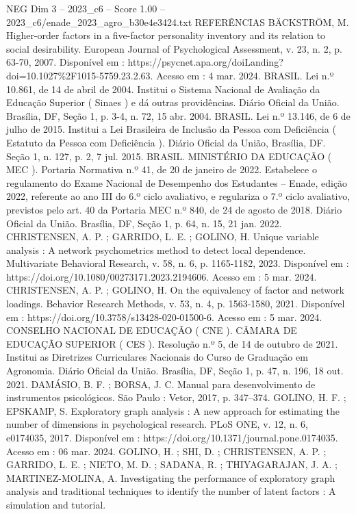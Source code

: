 \begin{textsample}{NEG Dim 3 – 2023\_c6 – Score 1.00 – 2023\_c6/enade\_2023\_agro\_b30e4e3424.txt}
REFERÊNCIAS BÄCKSTRÖM, M.
Higher-order factors in a five-factor personality inventory and its relation to social desirability.
European Journal of Psychological Assessment, v. 23, n. 2, p. 63-70, 2007.
Disponível em : https://psycnet.apa.org/doiLanding? doi=10.1027\%2F1015-5759.23.2.63.
Acesso em : 4 mar. 2024.
BRASIL.
Lei n.º 10.861, de 14 de abril de 2004.
Institui o Sistema Nacional de Avaliação da Educação Superior ( Sinaes ) e dá outras providências.
Diário Oficial da União.
Brasília, DF, Seção 1, p. 3-4, n. 72, 15 abr. 2004.
BRASIL.
Lei n.º 13.146, de 6 de julho de 2015.
Institui a Lei Brasileira de Inclusão da Pessoa com Deficiência ( Estatuto da Pessoa com Deficiência ).
Diário Oficial da União, Brasília, DF.
Seção 1, n. 127, p. 2, 7 jul. 2015.
BRASIL.
MINISTÉRIO DA EDUCAÇÃO ( MEC ).
Portaria Normativa n.º 41, de 20 de janeiro de 2022.
Estabelece o regulamento do Exame Nacional de Desempenho dos Estudantes – Enade, edição 2022, referente ao ano III do 6.º ciclo avaliativo, e regulariza o 7.º ciclo avaliativo, previstos pelo art. 40 da Portaria MEC n.º 840, de 24 de agosto de 2018.
Diário Oficial da União.
Brasília, DF, Seção 1, p. 64, n. 15, 21 jan. 2022.
CHRISTENSEN, A.
P. ; GARRIDO, L.
E. ; GOLINO, H.
Unique variable analysis : A network psychometrics method to detect local dependence.
Multivariate Behavioral Research, v. 58, n. 6, p. 1165-1182, 2023.
Disponível em : https://doi.org/10.1080/00273171.2023.2194606.
Acesso em : 5 mar. 2024.
CHRISTENSEN, A.
P. ; GOLINO, H.
On the equivalency of factor and network loadings.
Behavior Research Methods, v. 53, n. 4, p. 1563-1580, 2021.
Disponível em : https://doi.org/10.3758/s13428-020-01500-6.
Acesso em : 5 mar. 2024.
CONSELHO NACIONAL DE EDUCAÇÃO ( CNE ).
CÂMARA DE EDUCAÇÃO SUPERIOR ( CES ).
Resolução n.º 5, de 14 de outubro de 2021.
Institui as Diretrizes Curriculares Nacionais do Curso de Graduação em Agronomia.
Diário Oficial da União.
Brasília, DF, Seção 1, p. 47, n. 196, 18 out. 2021.
DAMÁSIO, B.
F. ; BORSA, J.
C.
Manual para desenvolvimento de instrumentos psicológicos.
São Paulo : Vetor, 2017, p. 347–374.
GOLINO, H.
F. ; EPSKAMP, S.
Exploratory graph analysis : A new approach for estimating the number of dimensions in psychological research.
PLoS ONE, v. 12, n. 6, e0174035, 2017.
Disponível em : https://doi.org/10.1371/journal.pone.0174035.
Acesso em : 06 mar. 2024.
GOLINO, H. ; SHI, D. ; CHRISTENSEN, A.
P. ; GARRIDO, L.
E. ; NIETO, M.
D. ; SADANA, R. ; THIYAGARAJAN, J.
A. ; MARTINEZ-MOLINA, A.
Investigating the performance of exploratory graph analysis and traditional techniques to identify the number of latent factors : A simulation and tutorial.

\end{textsample}
